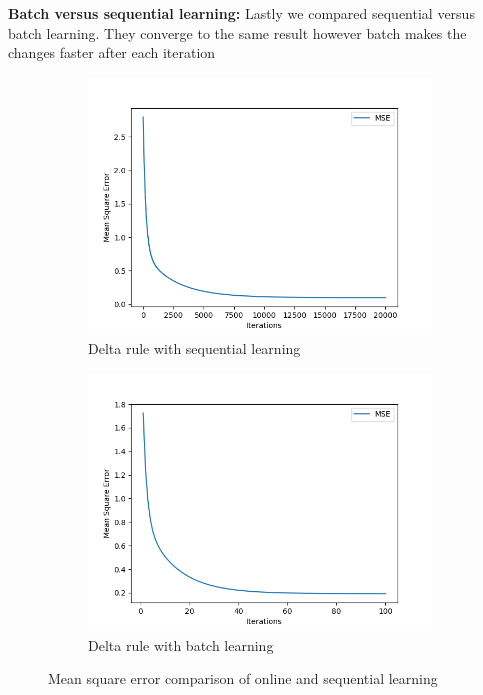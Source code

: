 \documentclass[a4paper]{article}
\begin{document}
\newpage
\textbf{Batch versus sequential learning:} Lastly we compared sequential versus batch learning. They converge to the same result however batch makes the changes faster after each iteration
\begin{figure}[htb]
    \centering
    \begin{subfigure}{0.4\textwidth}
        \includegraphics[width=\textwidth]{Labs/Lab 1/Lab 1a/Results/delta-linear-seperable-bias-sequential.png}
        \caption{Delta rule with sequential learning}
        \label{fig:Delta Rule with sequential learning}
    \end{subfigure}
    \hfill
    \begin{subfigure}{0.4\textwidth}
        \includegraphics[width=\textwidth]{Labs/Lab 1/Lab 1a/Results/delta-linear-seperable-bias-BATCH.png}
        \caption{Delta rule with batch learning}
        \label{fig:DeltaRule with batch learning}
    \end{subfigure}
    \caption{Mean square error comparison of online and sequential learning}
    \label{fig:DeltaRule-NoBias}
\end{figure}
\end{document}
